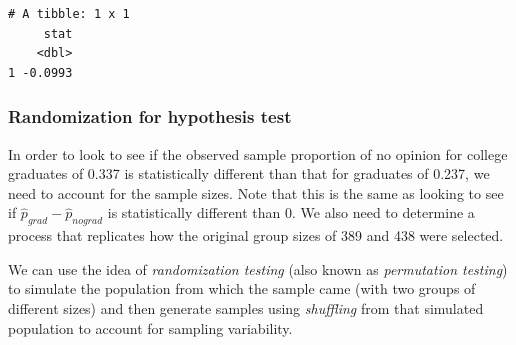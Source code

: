 \documentclass[12pt, krantz2,]{krantz}
\makeatletter
\newenvironment{Shaded}{\begin{snugshade}}{\end{snugshade}}
\newcommand{\DataTypeTok}[1]{\textcolor[rgb]{0.27,0.27,0.27}{#1}}
\newcommand{\DecValTok}[1]{\textcolor[rgb]{0.06,0.06,0.06}{#1}}
\newcommand{\KeywordTok}[1]{\textcolor[rgb]{0.27,0.27,0.27}{\textbf{#1}}}
\newcommand{\NormalTok}[1]{#1}
\newcommand{\OperatorTok}[1]{\textcolor[rgb]{0.43,0.43,0.43}{\textbf{#1}}}
\newcommand{\StringTok}[1]{\textcolor[rgb]{0.5,0.5,0.5}{#1}}
\newenvironment{kframe}{%
\medskip{}
\setlength{\fboxsep}{.8em}
 \def\at@end@of@kframe{}%
 \ifinner\ifhmode%
  \def\at@end@of@kframe{\end{minipage}}%
  \begin{minipage}{\columnwidth}%
 \fi\fi%
 \def\FrameCommand##1{\hskip\@totalleftmargin \hskip-\fboxsep
 \colorbox{shadecolor}{##1}\hskip-\fboxsep
     \hskip-\linewidth \hskip-\@totalleftmargin \hskip\columnwidth}%
 \MakeFramed {\advance\hsize-\width
   \@totalleftmargin\z@ \linewidth\hsize
   \@setminipage}}%
 {\par\unskip\endMakeFramed%
 \at@end@of@kframe}
\renewenvironment{Shaded}{\begin{kframe}}{\end{kframe}}
\makeatother
\begin{document}
\begin{verbatim}
# A tibble: 1 x 1
     stat
    <dbl>
1 -0.0993
\end{verbatim}

\hypertarget{randomization-for-hypothesis-test}{%
\subsubsection*{Randomization for hypothesis test}\label{randomization-for-hypothesis-test}}


In order to look to see if the observed sample proportion of no opinion for college graduates of 0.337 is statistically different than that for graduates of 0.237, we need to account for the sample sizes. Note that this is the same as looking to see if \(\hat{p}_{grad} - \hat{p}_{nograd}\) is statistically different than 0. We also need to determine a process that replicates how the original group sizes of 389 and 438 were selected.

We can use the idea of \emph{randomization testing} (also known as \emph{permutation testing}) to simulate the population from which the sample came (with two groups of different sizes) and then generate samples using \emph{shuffling} from that simulated population to account for sampling variability.

\begin{Shaded}
\end{Shaded}

\begin{Shaded}
\end{Shaded}
\end{document}
